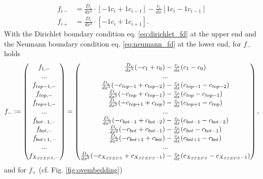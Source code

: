 \begin{align}
    f_{i-} &= \frac{D_i}{dx^2}\cdot [-1 c_i + 1 c_{i-1}] - \frac{v_i}{dx} [1 c_i - 1c_{i-1}]\\
    f_{i+} &= \frac{D_i}{dx^2}\cdot [-1 c_i + 1 c_{i+1}].
\end{align}
With the Dirichlet boundary condition eq. \ref{eq:dirichlet_fd} at the upper end and the Neumann boundary condition eq. \ref{eq:neumann_fd} at the lower end, for $f_{-}$ holds
\begin{equation}
\arraycolsep=1pt\def\arraystretch{1.1}
    f_{-} := \left(\begin{matrix}  f_{1,-}\\ ...\\f_{top-1,-}\\f_{top,-}\\f_{top+1,-}\\...\\f_{bot-1,-}\\f_{bot,-}\\f_{bot+1,-}\\
    ...\\ f_{X_{STEPS},-}\end{matrix}\right)= \left(\begin{matrix}  \frac{D_s}{dx^2}(-c_1+c_0) - \frac{v_s}{dx}(c_1 -c_0)\\ ...\\\frac{D_s}{dx^2}(-c_{top-1}+c_{top-2}) - \frac{v_s}{dx} (c_{top-1} -c_{top-2})\\\frac{D_s}{dx^2}(-c_{top}+c_{top-1}) - \frac{v_s}{dx} (c_{top} -c_{top-1})\\\frac{D_c}{dx^2}(-c_{top+1}+c_{top}) - \frac{v_c}{dx}(c_{top+1} -c_{top})\\...\\\frac{D_c}{dx^2}(-c_{bot-1}+c_{bot-2}) - \frac{v_c}{dx}(c_{bot-1} -c_{bot-2})\\\frac{D_c}{dx^2}(-c_{bot}+c_{bot-1}) - \frac{v_c}{dx} (c_{bot} -c_{bot-1})\\\frac{D_s}{dx^2}(-c_{bot+1}+c_{bot}) - \frac{v_s}{dx}(c_{bot+1} -c_{bot})\\
    ...\\ \frac{D_s}{dx^2}(-c_{X_{STEPS}}+c_{X_{STEPS}-1}) - \frac{v_s}{dx} (c_{X_{STEPS}} -c_{X_{STEPS}-1})\end{matrix}\right),
\end{equation}
and for $f_{+}$ (cf. Fig. \ref{fig:ovembedding})
